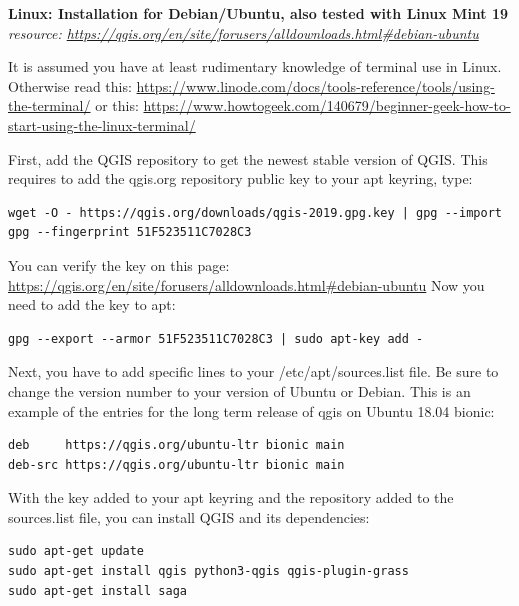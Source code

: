 \documentclass[12pt,a4paper]{scrartcl}
\begin{document}
\textbf{Linux: Installation for Debian/Ubuntu, also tested with Linux Mint 19} \newline
\textit{resource: \url{https://qgis.org/en/site/forusers/alldownloads.html\#debian-ubuntu}} \newline 

It is assumed you have at least rudimentary knowledge of terminal use in Linux. \newline
Otherwise read this: 
\url{https://www.linode.com/docs/tools-reference/tools/using-the-terminal/} \newline
or this: 
\url{https://www.howtogeek.com/140679/beginner-geek-how-to-start-using-the-linux-terminal/} \newline

First, add the QGIS repository to get the newest stable version of QGIS.
This requires to add the qgis.org repository public key to your apt keyring, type:

\begin{verbatim}
wget -O - https://qgis.org/downloads/qgis-2019.gpg.key | gpg --import
gpg --fingerprint 51F523511C7028C3
\end{verbatim}

You can verify the key on this page: \url{https://qgis.org/en/site/forusers/alldownloads.html\#debian-ubuntu}
Now you need to add the key to apt:  

\begin{verbatim}
gpg --export --armor 51F523511C7028C3 | sudo apt-key add -
\end{verbatim}

Next, you have to add specific lines to your /etc/apt/sources.list file.
Be sure to change the version number to your version of Ubuntu or Debian. \newline
This is an example of the entries for the long term release of qgis on Ubuntu 18.04 bionic:

\begin{verbatim}
deb     https://qgis.org/ubuntu-ltr bionic main
deb-src https://qgis.org/ubuntu-ltr bionic main
\end{verbatim}


With the key added to your apt keyring and the repository added to the sources.list file, you can install QGIS and its dependencies:  

\begin{verbatim}
sudo apt-get update
sudo apt-get install qgis python3-qgis qgis-plugin-grass
sudo apt-get install saga
\end{verbatim}
\end{document}
